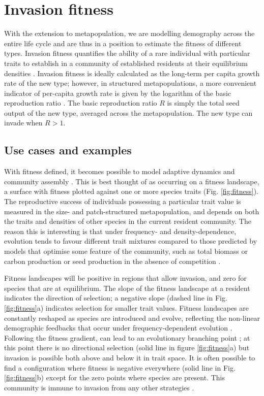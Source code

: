 \documentclass[a4paper,11pt]{article}
\begin{document}
\section{Invasion fitness}

With the extension to metapopulation, we are modelling demography across
the entire life cycle and are thus in a position to estimate the fitness
of different types. Invasion fitness quantifies the ability of a rare
individual with particular traits to establish in a community of
established residents at their equilibrium densities \citep{Metz-1992}.
Invasion fitness
is ideally calculated as the long-term per capita growth rate of the new
type; however, in structured metapopulations, a more convenient
indicator of per-capita growth rate is given by the logarithm of the
basic reproduction ratio \citep{Gyllenberg-2001, Metz-2001}. The basic
reproduction ratio \(R\) is simply the total seed output of the new
type, averaged across the metapopulation. The new type can invade when
\(R > 1\).

\subsection{Use cases and examples}

With fitness defined, it becomes possible to model adaptive dynamics
and community assembly \citep{Dieckmann-2007, Geritz-1998}. This is best
thought of as occurring on a fitness landscape, a surface with fitness
plotted against one or more species traits (Fig. \ref{fig:fitness}). The
reproductive success of individuals possessing a particular trait value
is measured in the size- and patch-structured metapopulation, and
depends on both the traits and densities of other species in the current
resident community. The reason this is interesting is that under
frequency- and density-dependence, evolution tends to favour different
trait mixtures compared to those predicted by models that optimise some
feature of the community, such as total biomass or carbon production or
seed production in the absence of competition
\citep{Falster-2003, Dieckmann-2007}.

Fitness landscapes will be positive in regions that allow invasion, and
zero for species that are at equilibrium. The slope of the fitness
landscape at a resident indicates the direction of selection; a negative
slope (dashed line in Fig. \ref{fig:fitness}a) indicates selection for
smaller trait values. Fitness landscapes are constantly reshaped
as species are introduced and evolve, reflecting the non-linear
demographic feedbacks that occur under frequency-dependent evolution
 \citep{Geritz-1998,Dieckmann-2007}. Following the fitness gradient, can lead to an
evolutionary branching point \citep{Geritz-1998,Dieckmann-2007};
at this point there is no directional selection (solid line in
figure \ref{fig:fitness}a) but invasion is possible both above and below
it in trait space. It is often possible
to find a configuration where fitness is negative everywhere (solid line
in Fig. \ref{fig:fitness}b) except for the zero points where species are
present. This community is immune to invasion from any other strategies
\citep{Geritz-1998}.
\end{document}
